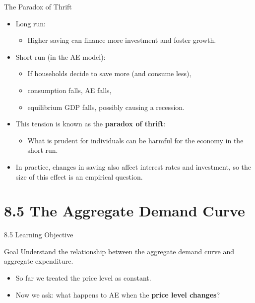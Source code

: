 \documentclass[aspectratio=169]{beamer}
\begin{document}
\begin{frame}{The Paradox of Thrift}
\transfade
\begin{itemize}
  \item Long run:
  \begin{itemize}
    \item Higher saving can finance more investment and foster growth.
  \end{itemize}
  \item Short run (in the AE model):
  \begin{itemize}
    \item If households decide to save more (and consume less),
    \item consumption falls, AE falls,
    \item equilibrium GDP falls, possibly causing a recession.
  \end{itemize}
  \item This tension is known as the \textbf{paradox of thrift}:
  \begin{itemize}
    \item What is prudent for individuals can be harmful for the economy in the short run.
  \end{itemize}
  \item In practice, changes in saving also affect interest rates and investment, so the size of this effect is an empirical question.
\end{itemize}
\end{frame}

\section{8.5 The Aggregate Demand Curve}

\begin{frame}{8.5 Learning Objective}
\transfade
\begin{block}{Goal}
Understand the relationship between the aggregate demand curve and aggregate expenditure.
\end{block}
\begin{itemize}
  \item So far we treated the price level as constant.
  \item Now we ask: what happens to AE when the \textbf{price level changes}?
\end{itemize}
\end{frame}
\end{document}
